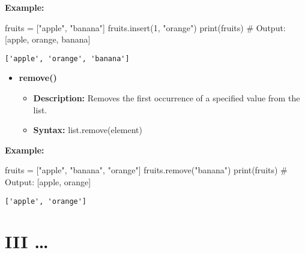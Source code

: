\documentclass[
  letterpaper,
  DIV=11,
  numbers=noendperiod]{scrreprt}
\newenvironment{Shaded}{\begin{snugshade}}{\end{snugshade}}
\newcommand{\BuiltInTok}[1]{\textcolor[rgb]{0.00,0.23,0.31}{#1}}
\newcommand{\CommentTok}[1]{\textcolor[rgb]{0.37,0.37,0.37}{#1}}
\newcommand{\DecValTok}[1]{\textcolor[rgb]{0.68,0.00,0.00}{#1}}
\newcommand{\NormalTok}[1]{\textcolor[rgb]{0.00,0.23,0.31}{#1}}
\newcommand{\OperatorTok}[1]{\textcolor[rgb]{0.37,0.37,0.37}{#1}}
\newcommand{\StringTok}[1]{\textcolor[rgb]{0.13,0.47,0.30}{#1}}
\providecommand{\tightlist}{%
  \setlength{\itemsep}{0pt}\setlength{\parskip}{0pt}}
\begin{document}
\textbf{Example:}

\begin{Shaded}
\begin{Highlighting}[]
\NormalTok{fruits }\OperatorTok{=}\NormalTok{ [}\StringTok{"apple"}\NormalTok{, }\StringTok{"banana"}\NormalTok{]}
\NormalTok{fruits.insert(}\DecValTok{1}\NormalTok{, }\StringTok{"orange"}\NormalTok{)}
\BuiltInTok{print}\NormalTok{(fruits)  }\CommentTok{\# Output: [\textquotesingle{}apple\textquotesingle{}, \textquotesingle{}orange\textquotesingle{}, \textquotesingle{}banana\textquotesingle{}]}
\end{Highlighting}
\end{Shaded}

\begin{verbatim}
['apple', 'orange', 'banana']
\end{verbatim}

\begin{itemize}
\tightlist
\item
  \textbf{remove()}

  \begin{itemize}
  \tightlist
  \item
    \textbf{Description:} Removes the first occurrence of a specified
    value from the list.
  \item
    \textbf{Syntax:} list.remove(element)
  \end{itemize}
\end{itemize}

\textbf{Example:}

\begin{Shaded}
\begin{Highlighting}[]
\NormalTok{fruits }\OperatorTok{=}\NormalTok{ [}\StringTok{"apple"}\NormalTok{, }\StringTok{"banana"}\NormalTok{, }\StringTok{"orange"}\NormalTok{]}
\NormalTok{fruits.remove(}\StringTok{"banana"}\NormalTok{)}
\BuiltInTok{print}\NormalTok{(fruits)  }\CommentTok{\# Output: [\textquotesingle{}apple\textquotesingle{}, \textquotesingle{}orange\textquotesingle{}]}
\end{Highlighting}
\end{Shaded}

\begin{verbatim}
['apple', 'orange']
\end{verbatim}

\section{III \ldots{}}
\end{document}
